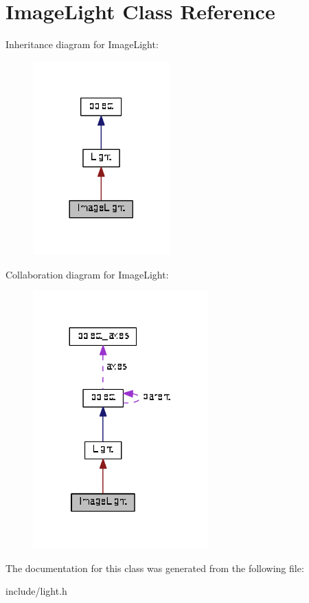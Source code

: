 \hypertarget{classImageLight}{}\section{Image\+Light Class Reference}
\label{classImageLight}


Inheritance diagram for Image\+Light\+:\nopagebreak
\begin{figure}[H]
\begin{center}
\leavevmode
\includegraphics[width=149pt]{classImageLight__inherit__graph}
\end{center}
\end{figure}


Collaboration diagram for Image\+Light\+:\nopagebreak
\begin{figure}[H]
\begin{center}
\leavevmode
\includegraphics[width=191pt]{classImageLight__coll__graph}
\end{center}
\end{figure}


The documentation for this class was generated from the following file\+:\begin{DoxyCompactItemize}
\item 
include/light.\+h\end{DoxyCompactItemize}
